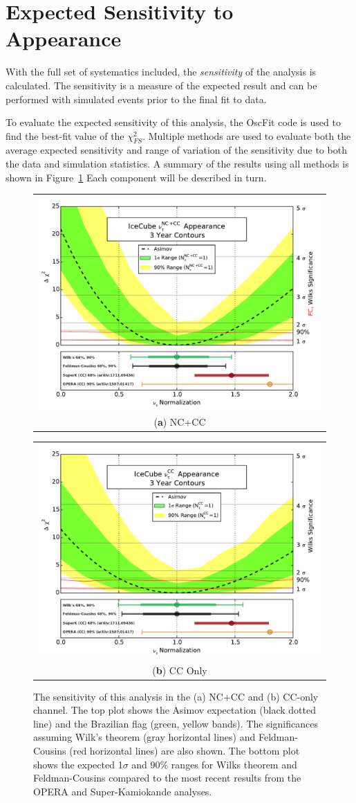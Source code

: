 \label{sec:sensitivity}
\section{Expected Sensitivity to Appearance}
With the full set of systematics included, the \emph{sensitivity} of the analysis is calculated.
The sensitivity is a measure of the expected result and can be performed with simulated events prior to the final fit to data.

To evaluate the expected sensitivity of this analysis, the OscFit code is used to find the best-fit value of the $\chi^2_{FS}$.
Multiple methods are used to evaluate both the average expected sensitivity and range of variation of the sensitivity due to both the data and simulation statistics.
A summary of the results using all methods is shown in Figure~\ref{fig:mc_sensitivity}
Each component will be described in turn.

\begin{figure}[h]
\centering
\begin{tabular}[b]{c}
  \includegraphics[width=0.45\linewidth]{nc_cc_feldman_cousins.pdf} \\
  \small (\textbf{\color{ctcolormain}a}) NC+CC 
\end{tabular} \hspace{2pt}
\begin{tabular}[b]{c}
  \includegraphics[width=0.45\linewidth]{cc_feldman_cousins.pdf} \\
  \small (\textbf{\color{ctcolormain}b}) CC Only
\end{tabular}
	\caption{The sensitivity of this analysis in the (a) NC+CC and (b) CC-only channel. The top plot shows the Asimov expectation (black dotted line) and the Brazilian flag (green, yellow bands). The significances assuming Wilk's theorem (gray horizontal lines) and Feldman-Cousins (red horizontal lines) are also shown. The bottom plot shows the expected 1$\sigma$ and 90\% ranges for Wilks theorem and Feldman-Cousins compared to the most recent results from the OPERA and Super-Kamiokande analyses.}
	\label{fig:mc_sensitivity}
\end{figure}

